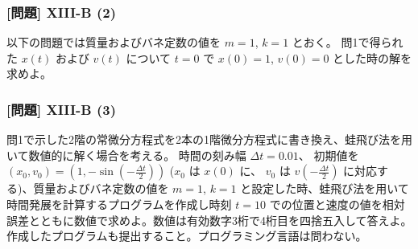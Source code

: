 \documentclass[dvipdfmx,aspectratio=169,20pt]{beamer}
\newcommand{\myfontsetting}[3]{{\fontsize{#1}{#2}\selectfont #3}}
\begin{document}
\begin{frame}
\frametitle{[問題] X\hspace{-.1em}I\hspace{-.1em}I\hspace{-.1em}I-B (2)}
\myfontsetting{18pt}{18pt}{
以下の問題では質量およびバネ定数の値を $m=1$, $k=1$ とおく。
問1で得られた $x(t)$ および $v(t)$ について $t=0$ で $x(0)=1$, $v(0)=0$ とした時の解を求めよ。
}
\end{frame}
\begin{frame}
\frametitle{[問題] X\hspace{-.1em}I\hspace{-.1em}I\hspace{-.1em}I-B (3)}
\myfontsetting{13pt}{15pt}{
問1で示した2階の常微分方程式を2本の1階微分方程式に書き換え、蛙飛び法を用いて数値的に解く場合を考える。
時間の刻み幅 $\varDelta t=0.01$、 初期値を $(x_0,v_0)=(1,- \sin \left(- \frac{\varDelta t}{2}\right) )$ ($x_0$ は $x(0)$ に、 $v_0$ は $v\left(- \frac{\varDelta t}{2}\right)$ に対応する)、質量およびバネ定数の値を $m=1$, $k=1$ と設定した時、蛙飛び法を用いて時間発展を計算するプログラムを作成し時刻 $t=10$ での位置と速度の値を相対誤差とともに数値で求めよ。数値は有効数字3桁で4桁目を四捨五入して答えよ。
}\\
\myfontsetting{12pt}{12pt}{
作成したプログラムも提出すること。プログラミング言語は問わない。
}
\end{frame}
\end{document}
